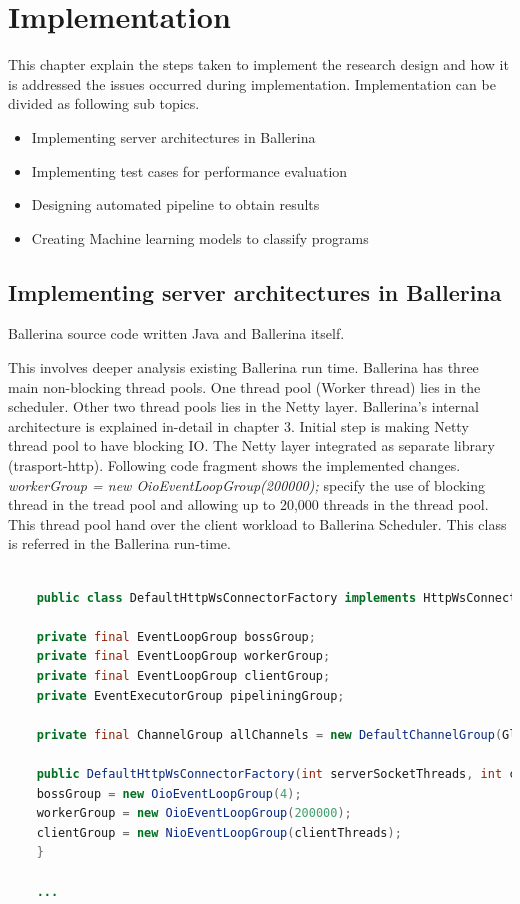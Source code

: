\chapter{Implementation} \label{chap:4}

This chapter explain the steps taken to implement the research design and how it is addressed the issues occurred during implementation. Implementation can be divided as following sub topics.

\begin{itemize}
	\item Implementing server architectures in Ballerina
	\item Implementing test cases for performance evaluation
	\item Designing automated pipeline to obtain results
	\item Creating Machine learning models to classify programs
\end{itemize}

\section{Implementing server architectures in Ballerina}

Ballerina source code written Java and Ballerina itself.

This involves deeper analysis existing Ballerina run time. Ballerina has three main non-blocking thread pools. One thread pool (Worker thread) lies in the scheduler. Other two thread pools lies in the Netty layer. Ballerina's internal architecture is explained in-detail in chapter 3. Initial step is making Netty thread pool to have blocking IO.
The Netty layer integrated as separate library (trasport-http)\cite{transport-http}. Following code fragment shows the implemented changes.  \textit{workerGroup = new OioEventLoopGroup(200000);} specify the use of blocking thread in the tread pool and allowing up to 20,000 threads in the thread pool. This thread pool hand over the client workload to Ballerina Scheduler. This class is referred in the Ballerina run-time.

\begin{lstlisting}[language=Java]

	public class DefaultHttpWsConnectorFactory implements HttpWsConnectorFactory {
	
	private final EventLoopGroup bossGroup;
	private final EventLoopGroup workerGroup;
	private final EventLoopGroup clientGroup;
	private EventExecutorGroup pipeliningGroup;
	
	private final ChannelGroup allChannels = new DefaultChannelGroup(GlobalEventExecutor.INSTANCE);
	
	public DefaultHttpWsConnectorFactory(int serverSocketThreads, int childSocketThreads, int clientThreads) {
	bossGroup = new OioEventLoopGroup(4);
	workerGroup = new OioEventLoopGroup(200000);
	clientGroup = new NioEventLoopGroup(clientThreads);
	}
	
	...
\end{lstlisting}


